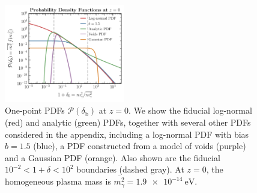 \documentclass[prd,aps,10pt,nofootinbib,twocolumn,superscriptaddress,preprintnumbers,balancelastpage,longbibliography]{revtex4-1}
\begin{document}
%
\begin{figure}[tbp]
    \centering
    \includegraphics[width=0.47\textwidth]{plots/PDFs}
    \caption{One-point PDFs $\mathcal{P}(\delta_\mathrm{b})$ at $z = 0$. We show the fiducial log-normal (red) and analytic (green) PDFs, together with several other PDFs considered in the appendix, including a log-normal PDF with bias $b = 1.5$ (blue), a PDF constructed from a model of voids (purple)~\cite{Adermann:2018jba} and a Gaussian PDF (orange). Also shown are the fiducial $10^{-2} < 1+\delta < 10^2$ boundaries (dashed gray). At $z = 0$, the homogeneous plasma mass is $\overline{m_\gamma^2} = \SI{1.9e-14}{\eV}$.~} 
    \label{fig:PDFs}
\end{figure}
%
\end{document}
